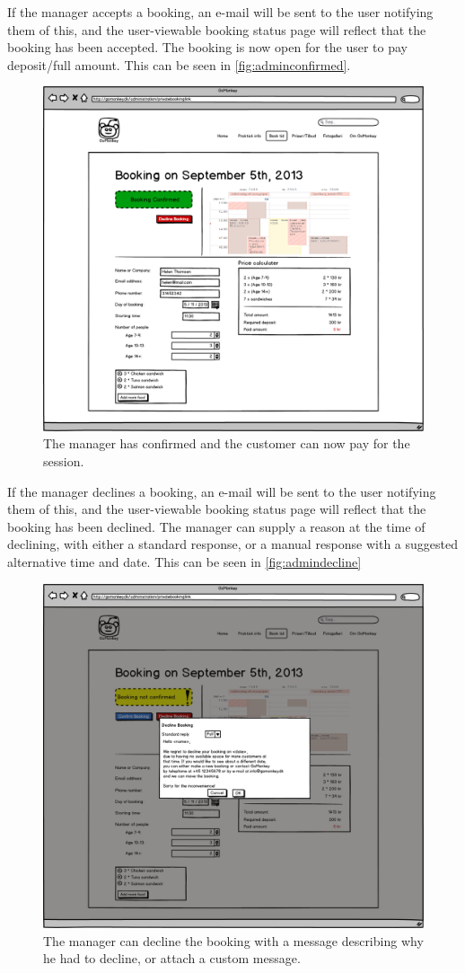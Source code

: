 If the manager accepts a booking, an e-mail will be sent to the user notifying 
them of this, and the user-viewable booking status page will reflect that the 
booking has been accepted. The booking is now open for the user to pay 
deposit/full amount. This can be seen in \autoref{fig:adminconfirmed}.

\begin{figure}[htbp]
    \centering
        \includegraphics[width=.6\textwidth]{figures/mockup/admin_booking_confirmed.png}
	    \caption{The manager has confirmed and the customer can now pay for the session.}
        \label{fig:adminconfirmed}
\end{figure}

If the manager declines a booking, an e-mail will be sent to the user notifying 
them of this, and the user-viewable booking status page will reflect that the 
booking has been declined. The manager can supply a reason at the time of 
declining, with either a standard response, or a manual response with a
suggested alternative time and date. This can be seen in \autoref{fig:admindecline}

\begin{figure}[htbp]
    \centering
        \includegraphics[width=.6\textwidth]{figures/mockup/admin_booking_decline.png}
	    \caption{The manager can decline the booking with a message describing why he had to decline, or attach a custom message.}
        \label{fig:admindecline}
\end{figure}

